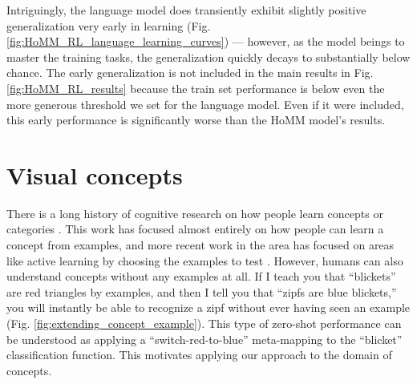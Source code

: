 Intriguingly, the language model does transiently exhibit slightly positive generalization very early in learning (Fig. \ref{fig:HoMM_RL_language_learning_curves}) --- however, as the model beings to master the training tasks, the generalization quickly decays to substantially below chance. The early generalization is not included in the main results in Fig. \ref{fig:HoMM_RL_results} because the train set performance is below even the more generous threshold we set for the language model. Even if it were included, this early performance is significantly worse than the HoMM model's results. \par



\section{Visual concepts}

There is a long history of cognitive research on how people learn concepts or categories \citep{Bourne1970, Medin1978, Kruschke1992, Goodman2008}. This work has focused almost entirely on how people can learn a concept from examples, and more recent work in the area has focused on areas like active learning by choosing the examples to test \citep{Markant2014, Markant2015}. However, humans can also understand concepts without any examples at all. If I teach you that ``blickets'' are red triangles by examples, and then I tell you that ``zipfs are blue blickets,'' you will instantly be able to recognize a zipf without ever having seen an example (Fig. \ref{fig:extending_concept_example}). This type of zero-shot performance can be understood as applying a ``switch-red-to-blue'' meta-mapping to the ``blicket'' classification function. This motivates applying our approach to the domain of concepts. \par 

